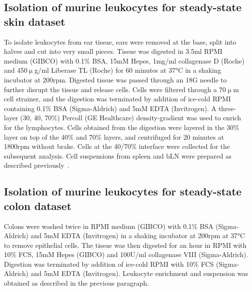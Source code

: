 \subsection{Isolation of murine leukocytes for steady-state skin dataset}
To isolate leukocytes from ear tissue, ears were removed at the base, split into halves and cut into very small pieces. Tissue was digested in 3.5ml RPMI medium (GIBCO) with 0.1${\%}$ BSA, 15mM Hepes, 1mg/ml collagenase D (Roche) and 450${\upmu}$g/ml Liberase TL (Roche) for 60 minutes at 37°C in a shaking incubator at 200rpm. Digested tissue was passed through an 18G needle to further disrupt the tissue and release cells. Cells were filtered through a 70${\upmu}$m cell strainer, and the digestion was terminated by addition of ice-cold RPMI containing 0.1${\%}$ BSA (Sigma-Aldrich) and 5mM EDTA (Invitrogen). A three-layer (30, 40, 70${\%}$) Percoll (GE Healthcare) density-gradient was used to enrich for the lymphocytes. Cells obtained from the digestion were layered in the 30${\%}$ layer on top of the 40${\%}$ and 70${\%}$ layers, and centrifuged for 20 minutes at 1800rpm without brake. Cells at the 40/70${\%}$ interface were collected for the subsequent analysis. Cell suspensions from spleen and bLN were prepared as described previously~\citep{Uhlig2006-om}.

\subsection{Isolation of murine leukocytes for steady-state colon dataset}
Colons were washed twice in RPMI medium (GIBCO) with 0.1${\%}$ BSA (Sigma-Aldrich) and 5mM EDTA (Invitrogen) in a shaking incubator at 200rpm at 37°C to remove epithelial cells. The tissue was then digested for an hour in RPMI with 10${\%}$ FCS, 15mM Hepes (GIBCO) and 100U/ml collagenase VIII (Sigma-Aldrich). Digestion was terminated by addition of ice-cold RPMI with 10${\%}$ FCS (Sigma-Aldrich) and 5mM EDTA (Invitrogen). Leukocyte enrichment and suspension was obtained as described in the previous paragraph.

